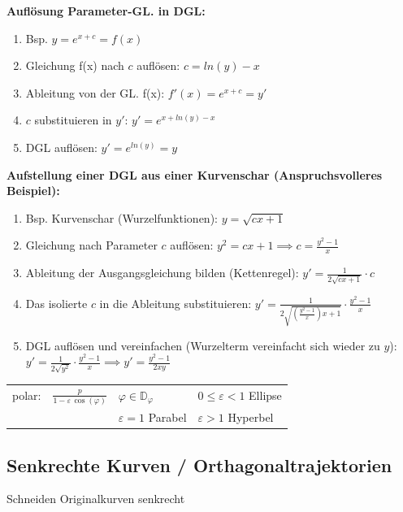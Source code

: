 \medskip

\textbf{Auflösung Parameter-GL. in DGL:}
\begin{enumerate}
    \item Bsp. $y = e^{x+c} = f(x)$
    \item Gleichung f(x) nach $c$ auflösen: $c= ln(y)-x$
    \item Ableitung von der GL. f(x): $f'(x) = e^{x+c} = y'$
    \item $c$ substituieren in $y'$: $y' = e^{x+ln(y)-x}$
    \item DGL auflösen: $y' = e^{ln(y)} = y$
\end{enumerate}
\textbf{Aufstellung einer DGL aus einer Kurvenschar (Anspruchsvolleres Beispiel):}
\begin{enumerate}
    \item Bsp. Kurvenschar (Wurzelfunktionen): $y = \sqrt{cx+1}$
    \item Gleichung nach Parameter $c$ auflösen: $y^2 = cx + 1 \implies c = \frac{y^2-1}{x}$
    \item Ableitung der Ausgangsgleichung bilden (Kettenregel): $y' = \frac{1}{2\sqrt{cx+1}} \cdot c$
    \item Das isolierte $c$ in die Ableitung substituieren: $y' = \frac{1}{2\sqrt{\left(\frac{y^2-1}{x}\right)x+1}} \cdot \frac{y^2-1}{x}$
    \item DGL auflösen und vereinfachen (Wurzelterm vereinfacht sich wieder zu $y$): $y' = \frac{1}{2\sqrt{y^2}} \cdot \frac{y^2-1}{x} \implies y' = \frac{y^2-1}{2xy}$
\end{enumerate}
    
\medskip

\begin{tabular}{llll}
    polar:  & $\frac{p}{1- \varepsilon \, \cos(\varphi)}$   & $\varphi \in \mathbb{D}_{\varphi}$    & $0 \leq \varepsilon < 1$ Ellipse \\
            &                                                & $\varepsilon = 1$ Parabel             & $\varepsilon > 1$ Hyperbel
\end{tabular}


\subsection{Senkrechte Kurven / Orthagonaltrajektorien}

Schneiden Originalkurven  senkrecht

\smallskip

